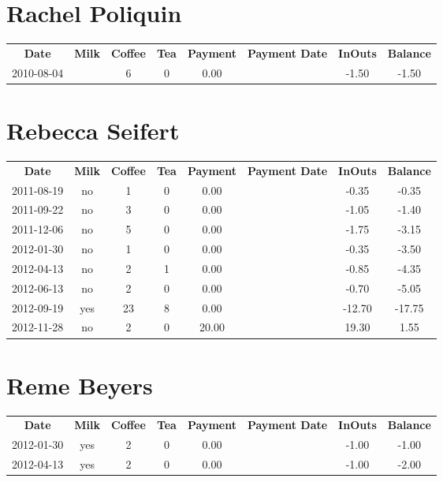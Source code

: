 \section{Rachel Poliquin}

\begin{center}
\begin{tabular}{cccccccc}
\textbf{Date} & \textbf{Milk} & \textbf{Coffee} & \textbf{Tea} & \textbf{Payment} & \textbf{Payment Date} & \textbf{InOuts} & \textbf{Balance} \\
2010-08-04 &  & 6 & 0 & 0.00 &  & -1.50 & -1.50
\end{tabular}
\end{center}

\section{Rebecca Seifert}

\begin{center}
\begin{tabular}{cccccccc}
\textbf{Date} & \textbf{Milk} & \textbf{Coffee} & \textbf{Tea} & \textbf{Payment} & \textbf{Payment Date} & \textbf{InOuts} & \textbf{Balance} \\
2011-08-19 & no &  1 & 0 &  0.00 &  &  -0.35 &  -0.35\\ 
2011-09-22 & no &  3 & 0 &  0.00 &  &  -1.05 &  -1.40\\ 
2011-12-06 & no &  5 & 0 &  0.00 &  &  -1.75 &  -3.15\\ 
2012-01-30 & no &  1 & 0 &  0.00 &  &  -0.35 &  -3.50\\ 
2012-04-13 & no &  2 & 1 &  0.00 &  &  -0.85 &  -4.35\\ 
2012-06-13 & no &  2 & 0 &  0.00 &  &  -0.70 &  -5.05\\ 
2012-09-19 & yes & 23 & 8 &  0.00 &  & -12.70 & -17.75\\ 
2012-11-28 & no &  2 & 0 & 20.00 &  &  19.30 &   1.55
\end{tabular}
\end{center}

\section{Reme Beyers}

\begin{center}
\begin{tabular}{cccccccc}
\textbf{Date} & \textbf{Milk} & \textbf{Coffee} & \textbf{Tea} & \textbf{Payment} & \textbf{Payment Date} & \textbf{InOuts} & \textbf{Balance} \\
2012-01-30 & yes & 2 & 0 & 0.00 &  & -1.00 & -1.00\\ 
2012-04-13 & yes & 2 & 0 & 0.00 &  & -1.00 & -2.00
\end{tabular}
\end{center}

